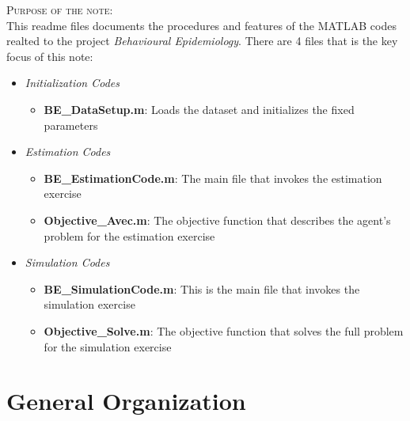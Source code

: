 \documentclass{../cls/NotesV2_Class}
\begin{document}



\textsc{Purpose of the note}:\\
This readme files documents the procedures and features of the MATLAB codes realted to the project \textit{Behavioural Epidemiology}. There are 4 files that is the key focus of this note:
\begin{itemize}
	\item \textit{Initialization Codes}
	\begin{itemize}
		\item \textbf{BE\_DataSetup.m}: Loads the dataset and initializes the fixed parameters
	\end{itemize}
	\item \textit{Estimation Codes}
	\begin{itemize}
		\item \textbf{BE\_EstimationCode.m}: The main file that invokes the estimation exercise
		\item \textbf{Objective\_Avec.m}: The objective function that describes the agent's problem for the estimation exercise
	\end{itemize}
	\item \textit{Simulation Codes}
	\begin{itemize}
		\item \textbf{BE\_SimulationCode.m}: This is the main file that invokes the simulation exercise
		\item \textbf{Objective\_Solve.m}: The objective function that solves the full problem for the simulation exercise
	\end{itemize}
\end{itemize}


\section{General Organization}
\end{document}
